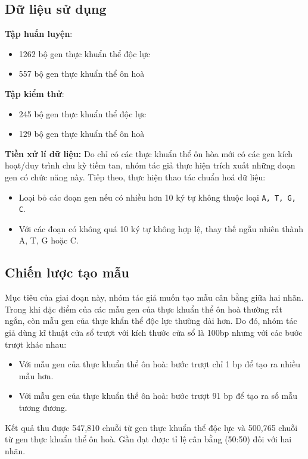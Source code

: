 \subsection*{Dữ liệu sử dụng}

\textbf{Tập huấn luyện}:
\begin{itemize}
    \item 1262 bộ gen thực khuẩn thể độc lực
    \item 557 bộ gen thực khuẩn thể ôn hoà
\end{itemize}
    
\textbf{Tập kiểm thử}:
\begin{itemize}
    \item 245 bộ gen thực khuẩn thể độc lực
    \item 129 bộ gen thực khuẩn thể ôn hoà
\end{itemize}
    
\textbf{Tiền xử lí dữ liệu:}
Do chỉ có các thực khuẩn thể ôn hòa mới có các gen kích hoạt/duy trình chu kỳ tiềm tan, nhóm tác giả thực hiện trích xuất những đoạn gen có chức năng này. Tiếp theo, thực hiện thao tác chuẩn hoá dữ liệu:
\begin{itemize}
    \item Loại bỏ các đoạn gen nếu có nhiều hơn 10 ký tự không thuộc loại \texttt{A, T, G, C}.
    \item Với các đoạn có không quá 10 ký tự không hợp lệ, thay thế ngẫu nhiên thành A, T, G hoặc C.
\end{itemize}


\subsection*{Chiến lược tạo mẫu}
Mục tiêu của giai đoạn này, nhóm tác giả muốn tạo mẫu cân bằng giữa hai nhãn. Trong khi đặc điểm của các mẫu gen của thực khuẩn thể ôn hoà thường rất ngắn, còn mẫu gen của thực khẩn thể độc lực thường dài hơn. Do đó, nhóm tác giả dùng kĩ thuật cửa sổ trượt với kích thước cửa sổ là 100bp nhưng với các bước trượt khác nhau:
\begin{itemize}
    \item Với mẫu gen của thực khuẩn thể ôn hoà: bước trượt chỉ 1 bp để tạo ra nhiều mẫu hơn.
    \item Với mẫu gen của thực khuẩn thể ôn hoà: bước trượt 91 bp để tạo ra số mẫu tương đương.
\end{itemize}
Kết quả thu được 547{,}810 chuỗi từ gen thực khuẩn thể độc lực và 500{,}765 chuỗi từ gen thực khuẩn thể ôn hoà. Gần đạt được tỉ lệ cân bằng (50:50) đối với hai nhãn.

